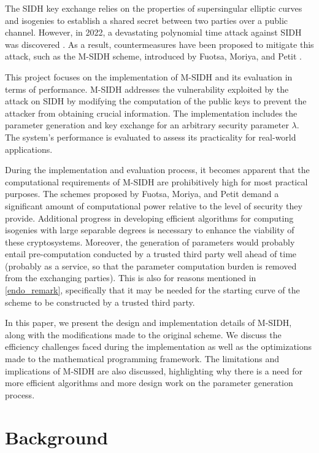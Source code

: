 \documentclass[a4paper,11pt,oneside]{report}
\begin{document}
The SIDH key exchange relies on the properties of supersingular elliptic curves and isogenies to establish a shared secret between two parties over a public channel. However, in 2022, a devastating polynomial time attack against SIDH was discovered \cite{attack, robert}. As a result, countermeasures have been proposed to mitigate this attack, such as the M-SIDH scheme, introduced by Fuotsa, Moriya, and Petit \cite{msidh}.

This project focuses on the implementation of M-SIDH and its evaluation in terms of performance. M-SIDH addresses the vulnerability exploited by the attack on SIDH by modifying the computation of the public keys to prevent the attacker from obtaining crucial information. The implementation includes the parameter generation and key exchange for an arbitrary security parameter $\lambda$. The system's performance is evaluated to assess its practicality for real-world applications.

During the implementation and evaluation process, it becomes apparent that the computational requirements of M-SIDH are prohibitively high for most practical purposes. The schemes proposed by Fuotsa, Moriya, and Petit demand a significant amount of computational power relative to the level of security they provide. Additional progress in developing efficient algorithms for computing isogenies with large separable degrees is necessary to enhance the viability of these cryptosystems. Moreover, the generation of parameters would probably entail pre-computation conducted by a trusted third party well ahead of time (probably as a service, so that the parameter computation burden is removed from the exchanging parties). This is also for reasons mentioned in \autoref{endo_remark}, specifically that it may be needed for the starting curve of the scheme to be constructed by a trusted third party.

In this paper, we present the design and implementation details of M-SIDH, along with the modifications made to the original scheme. We discuss the efficiency challenges faced during the implementation as well as the optimizations made to the mathematical programming framework. The limitations and implications of M-SIDH are also discussed, highlighting why there is a need for more efficient algorithms and more design work on the parameter generation process.

\chapter{Background}
\end{document}
